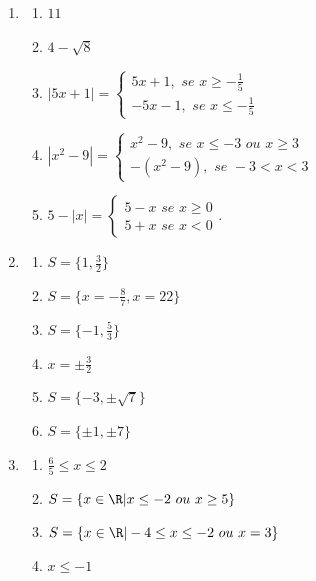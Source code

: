 \begin{enumerate}

\item
    \begin{enumerate}
        \item $11$
        \item $4-\sqrt{8}$
        \item $|5x+1|=\left\{\begin{array}{ll} 5x+1, \,\, se \,\, x \geq -\frac{1}{5}\\-5x-1, \,\, se \,\, x \leq -\frac{1}{5}\end{array}\right.$
        \item $|x^2-9|=\left\{\begin{array}{ll} x^2-9, \,\, se \,\, x \leq -3 \,\, ou \,\, x \geq 3\\-(x^2-9), \,\, se \,\, -3<x<3\end{array}\right.$
        \item $5-|x|=\left\{\begin{array}{ll} 5-x \,\, se \,\, x \geq 0\\5+x \,\, se \,\, x < 0\end{array}.\right.$
    \end{enumerate}

\item
    \begin{enumerate}
        \item $S=\{ 1, \frac{3}{2}\}$
        \item $S=\{x=-\frac{8}{7}, x=22\}$
        \item $S=\{-1,\frac{5}{3}\}$
        \item $x=\pm \frac{3}{2}$
        \item $S=\{-3, \pm\sqrt{7}\}$
        \item $S=\{\pm 1, \pm 7\}$
    \end{enumerate}

\item
    \begin{enumerate}
        \item $\frac{6}{5} \leq x \leq 2$
        \item $S= \{ x \in \R| x \leq -2 \,\, ou \,\, x \geq 5\}$
        \item $S= \{ x \in \R| -4 \leq x \leq -2 \,\, ou \,\, x=3\}$
        \item $x \leq -1$
    \end{enumerate}


\end{enumerate}

